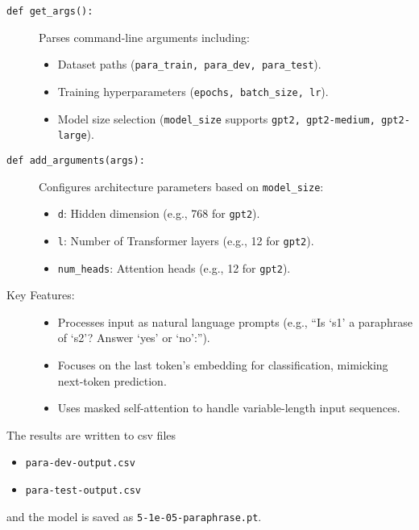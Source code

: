 \begin{description}
  \item[\texttt{def get\_args():}]  
    Parses command-line arguments including:  
    \begin{itemize}
      \item Dataset paths (\texttt{para\_train, para\_dev, para\_test}).
      \item Training hyperparameters (\texttt{epochs, batch\_size, lr}).
      \item Model size selection (\texttt{model\_size} supports \texttt{gpt2, gpt2-medium, gpt2-large}).
    \end{itemize}

  \item[\texttt{def add\_arguments(args):}]  
    Configures architecture parameters based on \texttt{model\_size}:  
    \begin{itemize}
      \item \texttt{d}: Hidden dimension (e.g., 768 for \texttt{gpt2}).
      \item \texttt{l}: Number of Transformer layers (e.g., 12 for \texttt{gpt2}).
      \item \texttt{num\_heads}: Attention heads (e.g., 12 for \texttt{gpt2}).
    \end{itemize}

  \item[Key Features:]  
    \begin{itemize}
      \item Processes input as natural language prompts (e.g., “Is `{s1}' a paraphrase of `{s2}'? Answer `yes' or `no':”).
      \item Focuses on the last token's embedding for classification, mimicking next-token prediction.
      \item Uses masked self-attention to handle variable-length input sequences.
    \end{itemize}

\end{description}
The results are written to csv files 
\begin{itemize}
  \item \texttt{para-dev-output.csv}
  \item \texttt{para-test-output.csv}
\end{itemize}
and the model is saved as \texttt{5-1e-05-paraphrase.pt}.